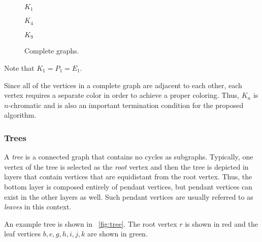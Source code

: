 \begin{figure}[H]
  \begin{minipage}{1.75in}
    \centering

    \(K_1\)
  \end{minipage}
  \begin{minipage}{1.75in}
    \centering

    \(K_4\)
  \end{minipage}
  \begin{minipage}{1.75in}
    \centering

    \(K_9\)
  \end{minipage}
  \caption{Complete graphs.}
  \label{fig:complete}
\end{figure}

Note that \(K_1=P_1=E_1\).

Since all of the vertices in a complete graph are adjacent to each other, each vertex requires a separate color in
order to achieve a proper coloring.  Thus, \(K_n\) is \(n\)-chromatic and is also an important termination
condition for the proposed algorithm.

\subsubsection{Trees}\label{sec:sub:sub:trees}

A \emph{tree} is a connected graph that contains no cycles as subgraphs.  Typically, one vertex of the tree is
selected as the \emph{root} vertex and then the tree is depicted in layers that contain vertices that are
equidistant from the root vertex.  Thus, the bottom layer is composed entirely of pendant vertices, but pendant
vertices can exist in the other layers as well.  Such pendant vertices are usually referred to as \emph{leaves} in
this context.

An example tree is shown in \figurename~\ref{fig:tree}.  The root vertex \(r\) is shown in red and the leaf
vertices \(b,e,g,h,i,j,k\) are shown in green.

